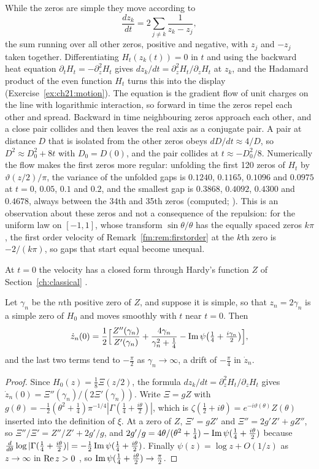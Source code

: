 While the zeros are simple they move according to
\[
\frac{dz_k}{dt}=2\sum_{j\ne k}\frac1{z_k-z_j},
\]
the sum running over all other zeros, positive and negative, with $z_j$ and $-z_j$ taken together. Differentiating $H_t(z_k(t))=0$ in $t$ and using the backward heat equation $\partial_tH_t=-\partial_z^2H_t$ gives $dz_k/dt=\partial_z^2H_t/\partial_zH_t$ at $z_k$, and the Hadamard product of the even function $H_t$ turns this into the display (Exercise~\ref{ex:ch21:motion}). The equation is the gradient flow of unit charges on the line with logarithmic interaction, so forward in time the zeros repel each other and spread. Backward in time neighbouring zeros approach each other, and a close pair collides and then leaves the real axis as a conjugate pair. A pair at distance $D$ that is isolated from the other zeros obeys $dD/dt\approx4/D$, so $D^2\approx D_0^2+8t$ with $D_0=D(0)$, and the pair collides at $t\approx-D_0^2/8$. Numerically the flow makes the first zeros more regular: unfolding the first 120 zeros of $H_t$ by $\vartheta(z/2)/\pi$, the variance of the unfolded gaps is $0.1240$, $0.1165$, $0.1096$ and $0.0975$ at $t=0$, $0.05$, $0.1$ and $0.2$, and the smallest gap is $0.3868$, $0.4092$, $0.4300$ and $0.4678$, always between the 34th and 35th zeros (computed; \cite{P26path}). This is an observation about these zeros and not a consequence of the repulsion: for the uniform law on $[-1,1]$, whose transform $\sin\theta/\theta$ has the equally spaced zeros $k\pi$, the first order velocity of Remark~\ref{fm:rem:firstorder} at the $k$th zero is $-2/(k\pi)$, so gaps that start equal become unequal.

At $t=0$ the velocity has a closed form through Hardy's function $Z$ of Section~\ref{ch:classical} \cite{P26pg3}.

\begin{proposition}\label{prop:ch21:velocity}
Let $\gamma_n$ be the $n$th positive zero of $Z$, and suppose it is simple, so that $z_n=2\gamma_n$ is a simple zero of $H_0$ and moves smoothly with $t$ near $t=0$. Then
\[
\dot z_n(0)=\frac12\Big[\frac{Z''(\gamma_n)}{Z'(\gamma_n)}+\frac{4\gamma_n}{\gamma_n^2+\frac14}-\operatorname{Im}\psi\big(\tfrac14+\tfrac{i\gamma_n}2\big)\Big],
\]
and the last two terms tend to $-\frac\pi2$ as $\gamma_n\to\infty$, a drift of $-\frac\pi4$ in $\dot z_n$.
\end{proposition}

\begin{proof}
Since $H_0(z)=\frac18\Xi(z/2)$, the formula $dz_k/dt=\partial_z^2H_t/\partial_zH_t$ gives $\dot z_n(0)=\Xi''(\gamma_n)/(2\Xi'(\gamma_n))$. Write $\Xi=gZ$ with $g(\theta)=-\frac12(\theta^2+\frac14)\pi^{-1/4}|\Gamma(\frac14+\frac{i\theta}2)|$, which is $\zeta(\frac12+i\theta)=e^{-i\vartheta(\theta)}Z(\theta)$ inserted into the definition of $\xi$. At a zero of $Z$, $\Xi'=gZ'$ and $\Xi''=2g'Z'+gZ''$, so $\Xi''/\Xi'=Z''/Z'+2g'/g$, and $2g'/g=4\theta/(\theta^2+\frac14)-\operatorname{Im}\psi(\frac14+\frac{i\theta}2)$ because $\frac d{d\theta}\log|\Gamma(\frac14+\frac{i\theta}2)|=-\frac12\operatorname{Im}\psi(\frac14+\frac{i\theta}2)$. Finally $\psi(z)=\log z+O(1/z)$ as $z\to\infty$ in $\operatorname{Re} z>0$ \cite[Section 5.11]{DLMF}, so $\operatorname{Im}\psi(\frac14+\frac{i\theta}2)\to\frac\pi2$.
\end{proof}

